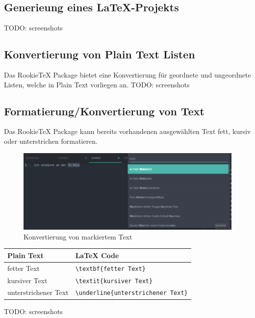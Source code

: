         \subsection{Generieung eines LaTeX-Projekts}
            TODO: screenshots

        \subsection{Konvertierung von Plain Text Listen}
            Das RookieTeX Package bietet eine Konvertierung für geordnete und ungeordnete Listen, welche in Plain Text vorliegen an.
            TODO: screenshots

        \subsection{Formatierung/Konvertierung von Text}
            Das RookieTeX Package kann bereits vorhandenen ausgewählten Text fett, kursiv oder unterstrichen formatieren.
            \\[5mm]
            \begin{figure}[H]
                \includegraphics[scale=0.5]{img/make_bold_example.png}
                \caption{Konvertierung von markiertem Text}
            \end{figure}
            \begin{minipage}{\textwidth}
                \begin{tabular}{ | l | l | }
                    \hline
                    \textbf{Plain Text} & \textbf{LaTeX Code} \\
                    \hline
                    fetter Text & \texttt{\textbackslash textbf\{fetter Text\}} \\
                    kursiver Text & \texttt{\textbackslash textit\{kursiver Text\}} \\
                    unterstrichener Text & \texttt{\textbackslash underline\{unterstrichener Text\}} \\
                    \hline
                \end{tabular}
            \end{minipage}
            TODO: screenshots


